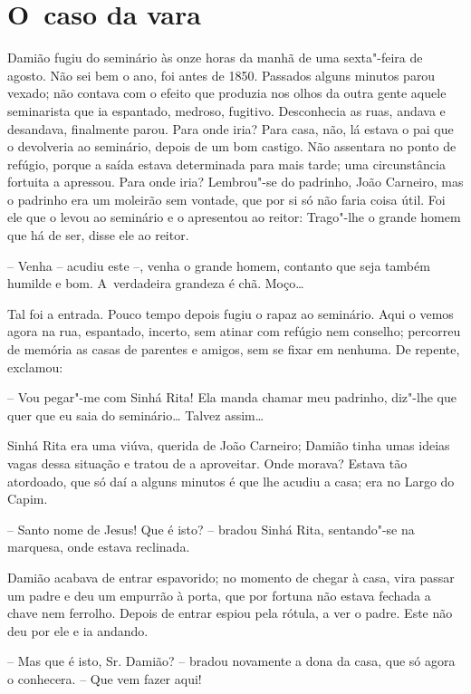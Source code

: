 \chapter{O~caso da vara}

Damião fugiu do seminário às onze horas da manhã de uma sexta"-feira de
agosto. Não sei bem o ano, foi antes de 1850. Passados alguns minutos
parou vexado; não contava com o efeito que produzia nos olhos da outra
gente aquele seminarista que ia espantado, medroso, fugitivo.
Desconhecia as ruas, andava e desandava, finalmente parou. Para onde
iria? Para casa, não, lá estava o pai que o devolveria ao seminário,
depois de um bom castigo. Não assentara no ponto de refúgio, porque a
saída estava determinada para mais tarde; uma circunstância fortuita a
apressou. Para onde iria? Lembrou"-se do padrinho, João Carneiro, mas o
padrinho era um moleirão sem vontade, que por si só não faria coisa
útil. Foi ele que o levou ao seminário e o apresentou ao reitor:
Trago"-lhe o grande homem que há de ser, disse ele ao reitor.

-- Venha -- acudiu este --, venha o grande homem, contanto que seja
também humilde e bom. A~verdadeira grandeza é chã. Moço\ldots{}

Tal foi a entrada. Pouco tempo depois fugiu o rapaz ao seminário. Aqui o
vemos agora na rua, espantado, incerto, sem atinar com refúgio nem
conselho; percorreu de memória as casas de parentes e amigos, sem se
fixar em nenhuma. De repente, exclamou:

-- Vou pegar"-me com Sinhá Rita! Ela manda chamar meu padrinho, diz"-lhe
que quer que eu saia do seminário\ldots{} Talvez assim\ldots{}

Sinhá Rita era uma viúva, querida de João Carneiro; Damião tinha umas
ideias vagas dessa situação e tratou de a aproveitar. Onde morava?
Estava tão atordoado, que só daí a alguns minutos é que lhe acudiu a
casa; era no Largo do Capim.

-- Santo nome de Jesus! Que é isto? -- bradou Sinhá Rita, sentando"-se na
marquesa, onde estava reclinada.

Damião acabava de entrar espavorido; no momento de chegar à casa, vira
passar um padre e deu um empurrão à porta, que por fortuna não estava
fechada a chave nem ferrolho. Depois de entrar espiou pela rótula, a ver
o padre. Este não deu por ele e ia andando.

-- Mas que é isto, Sr. Damião? -- bradou novamente a dona da casa, que
só agora o conhecera. -- Que vem fazer aqui!

